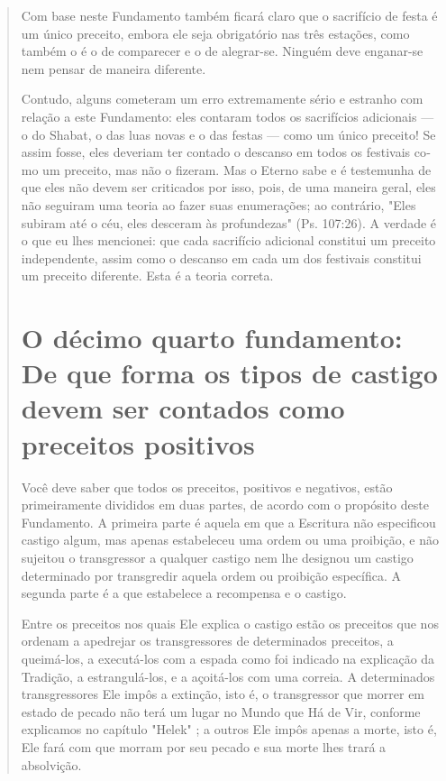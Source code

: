 \begin{quote}

Com base neste Fundamento também ficará claro que o sacrifício de festa
é um único preceito, embora ele seja obrigatório nas três estações,
co­mo também o é o de comparecer e o de alegrar-se. Ninguém deve
enganar-se nem pensar de maneira diferente.

Contudo, alguns cometeram um erro extremamente sério e estranho com
relação a este Fundamento: eles contaram todos os sacrifícios adicionais
--- o do Shabat, o das luas novas e o das festas --- como um único
preceito! Se assim fosse, eles deveriam ter contado o descanso em todos
os festivais co­mo um preceito, mas não o fizeram. Mas o Eterno sabe e é
testemunha de que eles não devem ser criticados por isso, pois, de uma
maneira geral, eles não seguiram uma teoria ao fazer suas enumerações;
ao contrário, "Eles subiram até o céu, eles desceram às profundezas"
(Ps. 107:26). A verdade é o que eu lhes mencionei: que cada sacrifício
adicional constitui um preceito indepen­dente, assim como o descanso em
cada um dos festivais constitui um preceito diferente. Esta é a teoria
correta.

\chapter{O décimo quarto fundamento: De que forma os tipos de castigo devem ser contados
como preceitos positivos}

Você deve saber que todos os preceitos, positivos e negativos, estão
primeiramente divididos em duas partes, de acordo com o propósito deste
Fun­damento. A primeira parte é aquela em que a Escritura não
especificou castigo algum, mas apenas estabeleceu uma ordem ou uma
proibição, e não sujeitou o transgressor a qualquer castigo nem lhe
designou um castigo determinado por transgredir aquela ordem ou
proibição específica. A segunda parte é a que estabelece a recompensa e
o castigo.

Entre os preceitos nos quais Ele explica o castigo estão os preceitos
que nos ordenam a apedrejar os transgressores de determinados preceitos,
a queimá-los, a executá-los com a espada como foi indicado na explicação
da Tra­dição, a estrangulá-los, e a açoitá-los com uma correia. A
determinados trans­gressores Ele impôs a extinção, isto é, o
transgressor que morrer em estado de pecado não terá um lugar no Mundo
que Há de Vir, conforme explicamos no capítulo "Helek" ; a outros Ele
impôs apenas a morte, isto é, Ele fará com que morram por seu pecado e
sua morte lhes trará a absolvição.


\end{quote}

